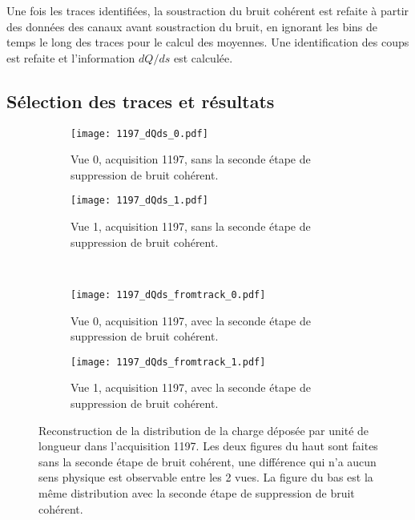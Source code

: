       Une fois les traces identifiées, la soustraction du bruit cohérent est refaite à partir des données des canaux avant soustraction du bruit, en ignorant les bins de temps le long des traces pour le calcul des moyennes. Une identification des coups est refaite et l'information $dQ/ds$ est calculée.

    \subsection{Sélection des traces et résultats}

      \begin{figure}[htbp]
        \centering
        \begin{subfigure}[t]{0.48\textwidth}
          \centering
          \texttt{[image: 1197\_dQds\_0.pdf]}
          \caption{Vue 0, acquisition 1197, sans la seconde étape de suppression de bruit cohérent.}
        \end{subfigure}\hfill
        \begin{subfigure}[t]{0.48\textwidth}
          \centering
          \texttt{[image: 1197\_dQds\_1.pdf]}
          \caption{Vue 1,  acquisition 1197, sans la seconde étape de suppression de bruit cohérent.}
        \end{subfigure}\\
        \begin{subfigure}[t]{0.48\textwidth}
          \centering
          \texttt{[image: 1197\_dQds\_fromtrack\_0.pdf]}
          \caption{Vue 0, acquisition 1197, avec la seconde étape de suppression de bruit cohérent.}
        \end{subfigure}\hfill
        \begin{subfigure}[t]{0.48\textwidth}
          \centering
          \texttt{[image: 1197\_dQds\_fromtrack\_1.pdf]}
          \caption{Vue 1, acquisition 1197, avec la seconde étape de suppression de bruit cohérent.}
        \end{subfigure}
        \caption[Reconstruction de la charge déposée par unité de longueur dans l'acquisition 1197]{\label{fig::dqds_1197_Rawdatasoft}Reconstruction de la distribution de la charge déposée par unité de longueur dans l'acquisition 1197. Les deux figures du haut sont faites sans la seconde étape de bruit cohérent, une différence qui n'a aucun sens physique est observable entre les 2 vues. La figure du bas est la même distribution avec la seconde étape de suppression de bruit cohérent.}
      \end{figure}


